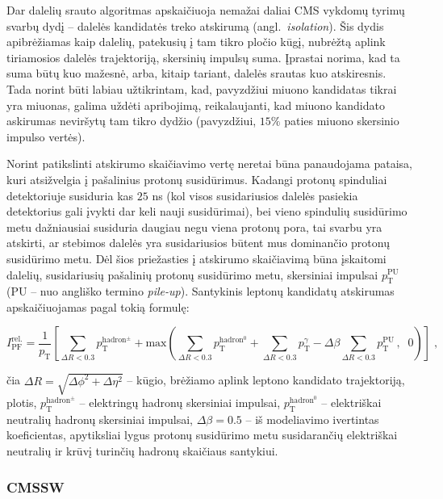 \documentclass[a4paper, 12pt]{article}
\newlength\q
\begin{document}
Dar dalelių srauto algoritmas apskaičiuoja nemažai daliai CMS vykdomų tyrimų svarbų dydį -- dalelės
kandidatės treko atskirumą (angl.\ \textit{isolation}).
Šis dydis apibrėžiamas kaip dalelių, patekusių į tam tikro pločio kūgį, nubrėžtą aplink tiriamosios
dalelės trajektoriją, skersinių impulsų suma.
Įprastai norima, kad ta suma būtų kuo mažesnė, arba, kitaip tariant, dalelės srautas kuo atskiresnis.
Tada norint būti labiau užtikrintam, kad, pavyzdžiui miuono kandidatas tikrai yra miuonas, galima
uždėti apribojimą, reikalaujanti, kad miuono kandidato askirumas neviršytų tam tikro dydžio
(pavyzdžiui, $15\%$ paties miuono skersinio impulso vertės).

Norint patikslinti atskirumo skaičiavimo vertę neretai būna panaudojama pataisa, kuri atsižvelgia į
pašalinius protonų susidūrimus.
Kadangi protonų spinduliai detektoriuje susiduria kas $25$ ns (kol visos susidariusios dalelės
pasiekia detektorius gali įvykti dar keli nauji susidūrimai), bei vieno spindulių susidūrimo metu
dažniausiai susiduria daugiau negu viena protonų pora, tai svarbu yra atskirti, ar stebimos dalelės
yra susidariusios būtent mus dominančio protonų susidūrimo metu.
Dėl šios priežasties į atskirumo skaičiavimą būna įskaitomi dalelių, susidariusių pašalinių
protonų susidūrimo metu, skersiniai impulsai $p_{\mathrm{T}}^{\mathrm{PU}}$ (PU -- nuo angliško
termino \textit{pile-up}).
Santykinis leptonų kandidatų atskirumas apskaičiuojamas pagal tokią formulę:

\begin{equation}
	\label{eq:isolation}
	I^{\mathrm{rel.}}_{\mathrm{PF}} = \frac{1}{p_{\mathrm{T}}} 
	\left[ \sum_{\Delta R<0.3} p_{\mathrm{T}}^{\mathrm{hadron^{\pm}}} +
	\mathrm{max} \left( \sum_{\Delta R<0.3} p_{\mathrm{T}}^{\mathrm{hadron^0}} + 
	\sum_{\Delta R<0.3} p_{\mathrm{T}}^{\gamma} -
	\Delta \beta \sum_{\Delta R<0.3} p_{\mathrm{T}}^{\mathrm{PU}}
	\, ,\;\; 0 \right) \right] \; \mathrm{,}
\end{equation}

čia $\Delta R = \sqrt{\Delta \phi^{2} + \Delta \eta^{2}}$ -- kūgio, brėžiamo aplink leptono kandidato
trajektoriją, plotis, $p_{\mathrm{T}}^{\mathrm{hadron^{\pm}}}$ -- elektringų hadronų skersiniai impulsai,
$p_{\mathrm{T}}^{\mathrm{hadron^0}}$ -- elektriškai neutralių hadronų skersiniai impulsai,
$\Delta\beta=0.5$ -- iš modeliavimo ivertintas koeficientas, apytiksliai lygus protonų susidūrimo metu
susidarančių elektriškai neutralių ir krūvį turinčių hadronų skaičiaus santykiui.


\subsubsection*{CMSSW}
\end{document}
